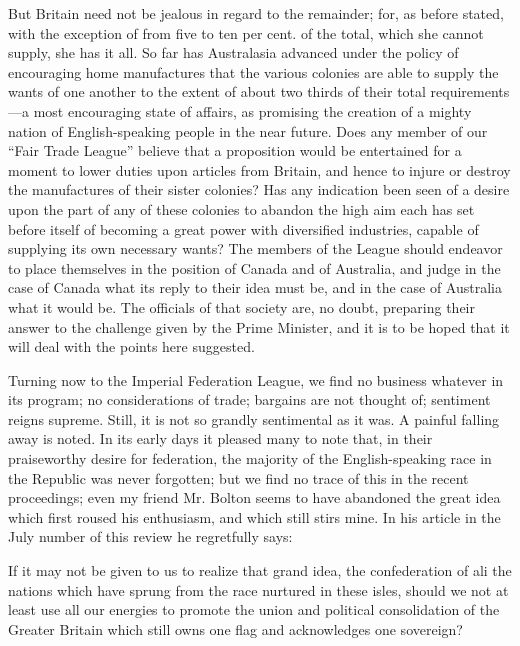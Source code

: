 \documentclass[11pt,openany]{book}
\begin{document}
But Britain need not be jealous in regard to the remainder; for, as before stated, with the exception of from five to ten per cent. of the total, which she cannot supply, she has it all. So far has Australasia advanced under the policy of encouraging home manufactures that the various colonies are able to supply the wants of one another to the extent of about two thirds of their total requirements ---a most encouraging state of affairs, as promising the creation of a mighty nation of English-speaking people in the near future. Does any member of our ``Fair Trade League'' believe that a proposition would be entertained for a moment to lower duties upon articles from Britain, and hence to injure or destroy the manufactures of their sister colonies? Has any indication been seen of a desire upon the part of any of these colonies to abandon the high aim each has set before itself of becoming a great power with diversified industries, capable of supplying its own necessary wants? The members of the League should endeavor to place themselves in the position of Canada and of Australia, and judge in the case of Canada what its reply to their idea must be, and in the case of Australia what it would be. The officials of that society are, no doubt, preparing their answer to the challenge given by the Prime Minister, and it is to be hoped that it will deal with the points here suggested.

Turning now to the Imperial Federation League, we find no business whatever in its program; no considerations of trade; bargains are not thought of; sentiment reigns supreme. Still, it is not so grandly sentimental as it was. A painful falling away is noted. In its early days it pleased many to note that, in their praiseworthy desire for federation, the majority of the English-speaking race in the Republic was never forgotten; but we find no trace of this in the recent proceedings; even my friend Mr. Bolton seems to have abandoned the great idea which first roused his enthusiasm, and which still stirs mine. In his article in the July number of this review he regretfully says:

If it may not be given to us to realize that grand idea, the confederation of ali the nations which have sprung from the race nurtured in these isles, should we not at least use all our energies to promote the union and political consolidation of the Greater Britain which still owns one flag and acknowledges one sovereign?
\end{document}
